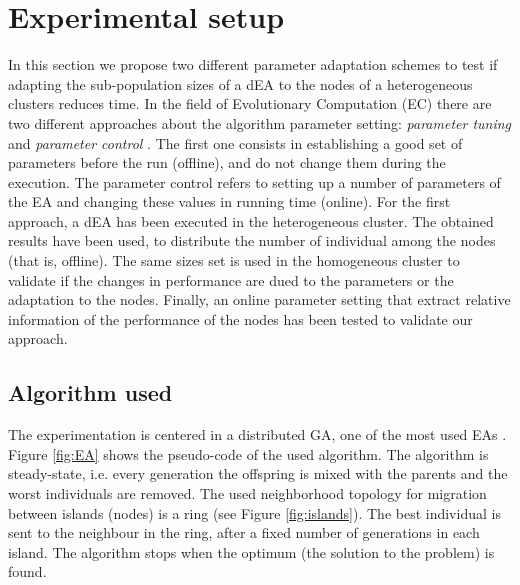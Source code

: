 \documentclass[final,1p,times]{elsarticle}
\begin{document}
 


\section{Experimental setup}
\label{sec:experiments}
In this section we propose two different parameter adaptation schemes to test if adapting the sub-population sizes of a dEA to the nodes of a  heterogeneous clusters reduces time. In the field of  Evolutionary Computation (EC) there are two different approaches about the algorithm parameter setting: {\em parameter tuning} and {\em parameter control} \cite{PARAMETERTUNING}. The first one consists in establishing a good set of parameters before the run (offline), and do not change them during the execution. The parameter control refers to setting up a number of parameters of the EA  and changing these values in running time (online). For the first approach, a dEA has been executed in the heterogeneous cluster. The obtained results have been used, to distribute the number of individual among the nodes (that is, offline). The same sizes set is used in the homogeneous cluster to validate if the changes in performance are dued to the parameters or the adaptation to the nodes. Finally, an online parameter setting that extract relative information of the performance of the nodes has been tested to validate our approach.




\subsection{Algorithm used}
The experimentation is centered in a distributed GA, one of the most used EAs \cite{GeneticAlgorithmsEiben03}. Figure \ref{fig:EA} shows the pseudo-code of the used algorithm.
The algorithm is steady-state, i.e. every generation the offspring is mixed with the parents and the worst individuals are removed. The used neighborhood topology for migration between islands (nodes) is a ring (see Figure \ref{fig:islands}). The best individual is sent to the neighbour in the ring, after a fixed number of generations in each island. The algorithm stops when the optimum (the solution to the problem) is found.  

\end{document}
